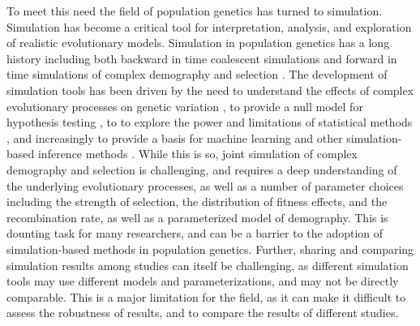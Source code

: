 \documentclass[hidelinks]{article}
\begin{document}
    To meet this need the field of population genetics
    has turned to simulation.
    Simulation has become a critical tool for interpretation, 
    analysis, and exploration of realistic evolutionary models.
    Simulation in population genetics has a long history 
    including both backward in time coalescent simulations
    \citep{kingman1982genealogy,hudson1983testing, hudson1990gene}
    and forward in time simulations of complex demography and selection
    \citep[e.g.,][]{gillespie1984molecular,thornton2014c++, haller2019slim}.
    The development of simulation tools has been driven by the need to
    understand the effects of complex evolutionary processes on genetic
    variation \citep[e.g.,][]{galloway2020few}, to provide a null model for hypothesis testing
    \citep[e.g.,][]{hudson1992statistical}, to
    to explore the power and limitations of statistical methods \cite[e.g.,]{przeworski2002signature},
    and increasingly to provide a basis for machine learning and other
    simulation-based inference methods \citep[e.g.,]{kern2018diplos}.
    While this is so, joint simulation of complex demography and selection
    is challenging, and requires a deep understanding of the underlying
    evolutionary processes, as well as a number of parameter choices including
    the strength of selection, the distribution of fitness effects, and the
    recombination rate, as well as a parameterized model of demography.
    This is dounting task for many researchers, and can be a barrier to
    the adoption of simulation-based methods in population genetics.
    Further, sharing and comparing simulation results among studies can 
    itself be challenging, as different simulation tools may use different
    models and parameterizations, and may not be directly comparable.
    This is a major limitation for the field, as it can make it difficult
    to assess the robustness of results, and to compare the results of
    different studies.
\end{document}
